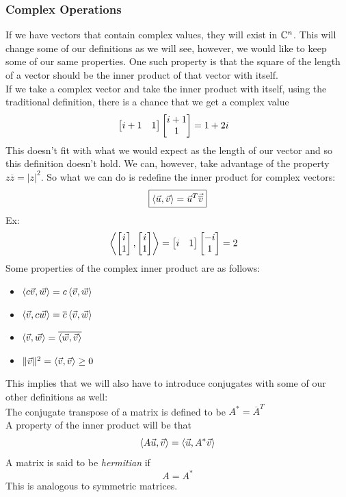 \documentclass[11pt, fleqn]{article}
\begin{document}
\subsubsection{Complex Operations}
If we have vectors that contain complex values, they will exist in $\mathbb{C}^n$. This will change some of our definitions as we will see, however, we would like to keep some of our same properties. One such property is that the square of the length of a vector should be the inner product of that vector with itself.\\
If we take a complex vector and take the inner product with itself, using the traditional definition, there is a chance that we get a complex value
\begin{align*}
    &\matrixx{i+1 & 1}\matrixx{i+1\\1}=1+2i
\end{align*}
This doesn't fit with what we would expect as the length of our vector and so this definition doesn't hold. We can, however, take advantage of the property $z\overline{z}=|z|^2$. So what we can do is redefine the inner product for complex vectors:
$$\boxed{\left\langle \vec{u},\vec{v} \right\rangle=\vec{u}^T\vec{\overline{v}}}$$
Ex:
\begin{align*}
    &\brangle{\matrixx{i\\1},\matrixx{i\\1}}=\matrixx{i & 1}\matrixx{-i\\1}=2
\end{align*}
Some properties of the complex inner product are as follows:
\begin{itemize}
    \item $\left\langle c\vec{v},\vec{w} \right\rangle=c\left\langle \vec{v},\vec{w} \right\rangle$
    \item $\left\langle \vec{v},c\vec{w} \right\rangle=\overline{c}\left\langle \vec{v},\vec{w} \right\rangle$
    \item $\left\langle \vec{v},\vec{w} \right\rangle=\overline{\left\langle \vec{w},\vec{v} \right\rangle}$
    \item $\|\vec{v}\|^2=\left\langle \vec{v},\vec{v} \right\rangle\geq0$
\end{itemize}
This implies that we will also have to introduce conjugates with some of our other definitions as well:\\
The conjugate transpose of a matrix is defined to be $A^*=\overline{A}^T$\\
A property of the inner product will be that
$$\left\langle A\vec{u},\vec{v} \right\rangle=\left\langle \vec{u},A^*\vec{v} \right\rangle$$
A matrix is said to be \textit{hermitian} if
$$\boxed{A=A^*}$$
This is analogous to symmetric matrices.\\
\end{document}
